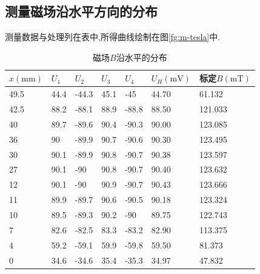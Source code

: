 \documentclass[UTF8,a4paper]{article}%
\begin{document}
\subsection{测量磁场沿水平方向的分布}
测量数据与处理列在表中,所得曲线绘制在图\ref{fg:m-tesla}中.
\begin{table}[H]
    \centering
    \caption{磁场$B$沿水平的分布}
    \begin{tabular}{l|llll|l|l}
        \hline
        $x(\unit{\mm})$ & $U_1$ & $U_2$ & $U_3$ & $U_4$ & $U_H(\unit{\mV})$ & 标定$B(\unit{\milli\tesla})$ \\ \hline
        49.5            & 44.4  & -44.3 & 45.1  & -45   & 44.70             & 61.132                     \\
        42.5            & 88.2  & -88.1 & 88.9  & -88.8 & 88.50             & 121.033                    \\
        40              & 89.7  & -89.6 & 90.4  & -90.3 & 90.00             & 123.085                    \\
        36              & 90    & -89.9 & 90.7  & -90.6 & 90.30             & 123.495                    \\
        30              & 90.1  & -89.9 & 90.8  & -90.7 & 90.38             & 123.597                    \\
        27              & 90.1  & -90   & 90.8  & -90.7 & 90.40             & 123.632                    \\
        12              & 90.1  & -90   & 90.9  & -90.7 & 90.43             & 123.666                    \\
        11              & 89.9  & -89.7 & 90.6  & -90.5 & 90.18             & 123.324                    \\
        10              & 89.5  & -89.3 & 90.2  & -90   & 89.75             & 122.743                    \\
        7               & 82.6  & -82.5 & 83.3  & -83.2 & 82.90             & 113.375                    \\
        4               & 59.2  & -59.1 & 59.9  & -59.8 & 59.50             & 81.373                     \\
        0               & 34.6  & -34.6 & 35.4  & -35.3 & 34.97             & 47.832                     \\ \hline
    \end{tabular}
\end{table}
\end{document}
